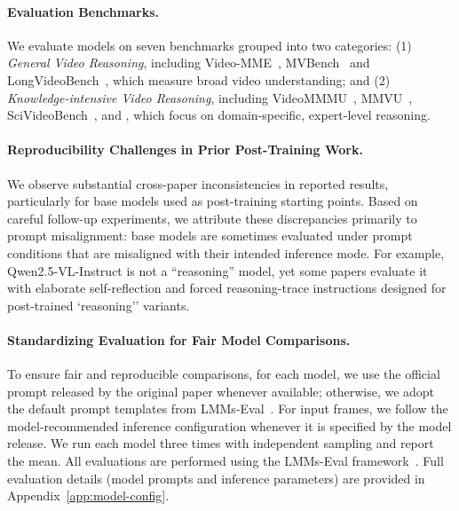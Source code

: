 \paragraph{Evaluation Benchmarks.}
We evaluate models on seven benchmarks
grouped into two categories: 
(1) \emph{General Video Reasoning}, including Video-MME~\cite{videmme}, MVBench~\cite{mvbench} and LongVideoBench~\cite{wu2024longvideobench}, which measure broad video understanding; and (2) \emph{Knowledge-intensive Video Reasoning}, including VideoMMMU~\cite{videommmu}, MMVU~\cite{mmvu},  SciVideoBench~\cite{scivideobench}, and \eval, which focus on domain-specific, expert-level reasoning. 

\vspace{-8pt}
\paragraph{Reproducibility Challenges in Prior Post-Training Work.}
We observe substantial cross-paper inconsistencies in reported results, particularly for base models used as post-training starting points. Based on careful follow-up experiments, we attribute these discrepancies primarily to prompt misalignment: base models are sometimes evaluated under prompt conditions that are misaligned with their intended inference mode. For example, Qwen2.5-VL-Instruct is not a ``reasoning'' model, yet some papers evaluate it with elaborate self-reflection and forced reasoning-trace instructions designed for post-trained `reasoning'' variants.

\vspace{-8pt}
\paragraph{Standardizing Evaluation for Fair Model Comparisons.}
To ensure fair and reproducible comparisons, for each model, we use the official prompt released by the original paper whenever available; otherwise, we adopt the default prompt templates from LMMs-Eval~\cite{lmms_eval}. For input frames, we follow the model-recommended inference configuration whenever it is specified by the model release. 
We run each model three times with independent sampling and report the mean.
All evaluations are performed using the LMMs-Eval framework~\cite{lmms_eval}.
Full evaluation details (\eg model prompts and inference parameters) are provided in Appendix~\ref{app:model-config}.






